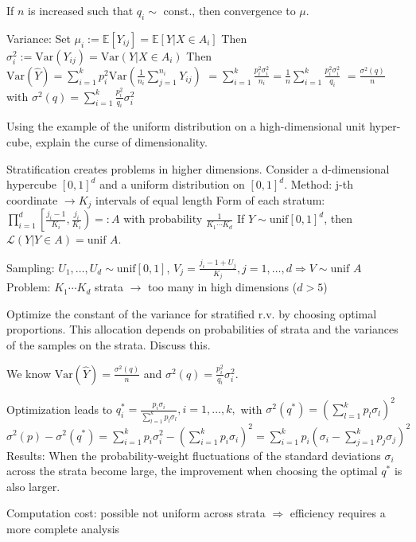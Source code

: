 If \(n\) is increased such that \(q_i \sim\) const., then convergence to \(\mu\).

Variance:
Set \(\mu_i := \mathbb{E}[Y_{ij}] = \mathbb{E}[Y | X \in A_i]\)
Then \(\sigma_i^2 := \text{Var}(Y_{ij}) = \text{Var}(Y | X \in A_i)\)
Then 
\(\text{Var}(\hat{Y}) = \sum_{i=1}^k p_i^2 \text{Var} \left( \frac{1}{n_i} \sum_{j=1}^{n_i} Y_{ij} \right)\) 
\(= \sum_{i=1}^k \frac{p_i^2 \sigma_i^2}{n_i} = \frac{1}{n} \sum_{i=1}^k \frac{p_i^2 \sigma_i^2}{q_i} \)
\(= \frac{\sigma^2(q)}{n}\) with \(\sigma^2(q) = \sum_{i=1}^k \frac{p_i^2}{q_i}\sigma_i^2  \)

Using the example of the uniform distribution on a high-dimensional unit hyper-
cube, explain the curse of dimensionality.

Stratification creates problems in higher dimensions.
Consider a d-dimensional hypercube \([0, 1]^d\) and a uniform distribution on \([0, 1]^d\).
Method:
j-th coordinate \(\rightarrow K_j\) intervals of equal length
Form of each stratum: \(\prod_{i=1}^d \left[ \frac{j_i - 1}{K_i}, \frac{j_i}{K_i} \right) =: A\) with probability \(\frac{1}{K_1 \dotsm K_d}\)
If \(Y \sim \text{unif}[0, 1]^d\), then \(\mathcal{L}(Y | Y \in A) = \text{unif } A\).

Sampling: \(U_1, \dots, U_d \sim \text{unif}[0, 1]\), \(V_j = \frac{j_i - 1 + U_j}{K_j}, j = 1, \dots, d \Rightarrow V \sim \text{unif } A\)
Problem: \(K_1 \dotsm K_d\) strata \(\rightarrow\) too many in high dimensions (\(d > 5\))


Optimize the constant of the variance for stratified r.v. by choosing optimal proportions. 
This allocation depends on probabilities of strata and the variances of the samples on the strata. 
Discuss this.

We know
\( \text{Var}(\hat{Y}) = \frac{\sigma^{2}(q)}{n} \)
and \( \sigma^{2}(q) = \frac{p_i^2}{q_i}\sigma_i^2 \).


Optimization leads to \(q_i^* = \frac{p_i \sigma_i}{\sum_{l=1}^k p_l \sigma_l}, i = 1, ..., k,\) with \(\sigma^2(q^*) = \left( \sum_{l=1}^k p_l \sigma_l \right)^2\) 
\(\sigma^2(p) - \sigma^2(q^*) = \sum_{i=1}^k p_i \sigma_i^2 - \left( \sum_{i=1}^k p_i \sigma_i \right)^2 = \sum_{i=1}^k p_i (\sigma_i - \sum_{j=1}^k p_j \sigma_j)^2\)
Results: When the probability-weight fluctuations of the standard deviations \(\sigma_i\) across the strata become large, the improvement when choosing the optimal 
\(q^*\) is also larger.

Computation cost: possible not uniform across strata \(\Rightarrow\) efficiency requires a more complete analysis 

